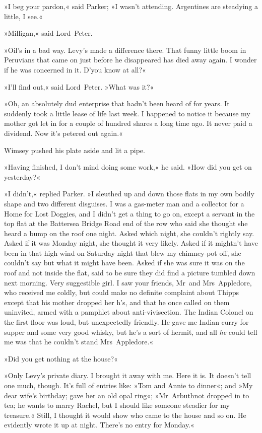 »I beg your pardon,« said Parker; »I wasn't attending. Argentines are steadying a little, I see.«

»Milligan,« said Lord~Peter.

»Oil's in a bad way. Levy's made a difference there. That funny little boom in Peruvians that came on just before he disappeared has died away again. I wonder if he was concerned in it. D'you know at all?«

»I'll find out,« said Lord~Peter. »What was it?«

»Oh, an absolutely dud enterprise that hadn't been heard of for years. It suddenly took a little lease of life last week. I happened to notice it because my mother got let in for a couple of hundred shares a long time ago. It never paid a dividend. Now it's petered out again.«

Wimsey pushed his plate aside and lit a pipe.

»Having finished, I don't mind doing some work,« he said. »How did you get on yesterday?«

»I didn't,« replied Parker. »I sleuthed up and down those flats in my own bodily shape and two different disguises. I was a gas-meter man and a collector for a Home for Lost Doggies, and I didn't get a thing to go on, except a servant in the top flat at the Battersea Bridge Road end of the row who said she thought she heard a bump on the roof one night. Asked which night, she couldn't rightly say. Asked if it was Monday night, she thought it very likely. Asked if it mightn't have been in that high wind on Saturday night that blew my chimney-pot off, she couldn't say but what it might have been. Asked if she was sure it was on the roof and not inside the flat, said to be sure they did find a picture tumbled down next morning. Very suggestible girl. I saw your friends, Mr~and Mrs~Appledore, who received me coldly, but could make no definite complaint about Thipps except that his mother dropped her h's, and that he once called on them uninvited, armed with a pamphlet about anti-vivisection. The Indian Colonel on the first floor was loud, but unexpectedly friendly. He gave me Indian curry for supper and some very good whisky, but he's a sort of hermit, and all \textit{he} could tell me was that he couldn't stand Mrs~Appledore.«

»Did you get nothing at the house?«

»Only Levy's private diary. I brought it away with me. Here it is. It doesn't tell one much, though. It's full of entries like: »Tom and Annie to dinner«; and »My dear wife's birthday; gave her an old opal ring«; »Mr~Arbuthnot dropped in to tea; he wants to marry Rachel, but I should like someone steadier for my treasure.« Still, I thought it would show who came to the house and so on. He evidently wrote it up at night. There's no entry for Monday.«


